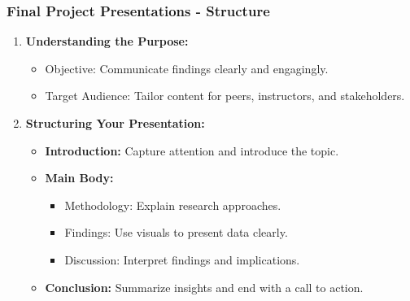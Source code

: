 \documentclass[aspectratio=169]{beamer}
\begin{document}
\begin{frame}[fragile]
    \frametitle{Final Project Presentations - Structure}
    \begin{enumerate}
        \item \textbf{Understanding the Purpose:}
            \begin{itemize}
                \item Objective: Communicate findings clearly and engagingly.
                \item Target Audience: Tailor content for peers, instructors, and stakeholders.
            \end{itemize}
        
        \item \textbf{Structuring Your Presentation:}
            \begin{itemize}
                \item \textbf{Introduction:} Capture attention and introduce the topic.
                \item \textbf{Main Body:}
                    \begin{itemize}
                        \item Methodology: Explain research approaches.
                        \item Findings: Use visuals to present data clearly.
                        \item Discussion: Interpret findings and implications.
                    \end{itemize}
                \item \textbf{Conclusion:} Summarize insights and end with a call to action.
            \end{itemize}
    \end{enumerate}
\end{frame}
\end{document}
